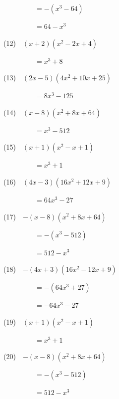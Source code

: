 \documentclass[a4j,twocolumn,10pt,fleqn]{jarticle}
\begin{document}
~~~~~~~~~$=-(x^{3} - 64)$

~~~~~~~~~$=64 - x^{3}$

(12)~~$\left(x + 2\right) \left(x^{2} - 2 x + 4\right)$

~~~~~~~~~$=x^{3} + 8$

(13)~~$\left(2 x - 5\right) \left(4 x^{2} + 10 x + 25\right)$

~~~~~~~~~$=8 x^{3} - 125$

(14)~~$\left(x - 8\right) \left(x^{2} + 8 x + 64\right)$

~~~~~~~~~$=x^{3} - 512$

(15)~~$\left(x + 1\right) \left(x^{2} - x + 1\right)$

~~~~~~~~~$=x^{3} + 1$

(16)~~$\left(4 x - 3\right) \left(16 x^{2} + 12 x + 9\right)$

~~~~~~~~~$=64 x^{3} - 27$

(17)~~$-\left(x - 8\right) \left(x^{2} + 8 x + 64\right)$

~~~~~~~~~$=-(x^{3} - 512)$

~~~~~~~~~$=512 - x^{3}$

(18)~~$-\left(4 x + 3\right) \left(16 x^{2} - 12 x + 9\right)$

~~~~~~~~~$=-(64 x^{3} + 27)$

~~~~~~~~~$=- 64 x^{3} - 27$

(19)~~$\left(x + 1\right) \left(x^{2} - x + 1\right)$

~~~~~~~~~$=x^{3} + 1$

(20)~~$-\left(x - 8\right) \left(x^{2} + 8 x + 64\right)$

~~~~~~~~~$=-(x^{3} - 512)$

~~~~~~~~~$=512 - x^{3}$
\end{document}
